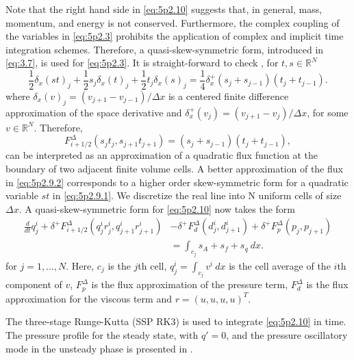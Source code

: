 Note that the right hand side in \eqref{eq:5p2.10} suggests that, in general, mass, momentum, and energy is not conserved. Furthermore, the complex coupling of the variables in \eqref{eq:5p2.3} prohibits the application of complex and implicit time integration schemes. Therefore, a quasi-skew-symmetric form, introduced in \eqref{eq:3.7}, is used for \eqref{eq:5p2.3}. It is straight-forward to check \cite{sjogreen2010skew}, for $t,s\in \mathbb R^{N}$
\begin{equation} \label{eq:5p2.9.1}
	\frac 1 2 \delta_x (st)_j + \frac 1 2 s_j \delta_x (t)_j + \frac 1 2 t_j \delta_x (s)_j = \frac 1 4 \delta_x^+( s_j + s_{j-1} )(t_j + t_{j-1}).
\end{equation}
where $\delta_x (v)_j = \left( v_{j+1} - v_{j-1} \right)/\Delta x$ is a centered finite difference approximation of the space derivative and $\delta_x^+ (v_j) = \left( v_{j+1} - v_j \right) /\Delta x$, for some $v\in \mathbb R^{N}$. Therefore,
\begin{equation} \label{eq:5p2.9.2}
	F_{i+1/2}^{\Delta}(s_jt_j,s_{j+1}t_{j+1}) = ( s_j + s_{j-1} )(t_j + t_{j-1}),
\end{equation}
can be interpreted as an approximation of a quadratic flux function at the boundary of two adjacent finite volume cells. A better approximation of the flux in \eqref{eq:5p2.9.2} corresponds to a higher order skew-symmetric form for a quadratic variable $st$ in \eqref{eq:5p2.9.1}. We discretize the real line into N uniform cells of size $\Delta x$. A quasi-skew-symmetric form for \eqref{eq:5p2.10} now takes the form
\begin{equation}
\begin{aligned}
	\frac{d}{dt} q^i_j + \delta^+ F^{\Delta}_{i+1/2}(q^i_jr^i_j,q^i_{j+1}r^i_{j+1}) &- \delta^+ F_d^{\Delta}(d^i_j,d^i_{j+1}) + \delta^+ F_p^{\Delta}(p_j,p_{j+1}) \\
	&= \int_{c_j} s_A + s_f + s_q \ dx.
\end{aligned}
\end{equation}
for $j=1,\dots,N$. Here, $c_j$ is the $j$th cell, $q^i_j = \int_{c_j} v^i \ dx$ is the cell average of the $i$th component of $v$, $F^{\Delta}_p$ is the flux approximation of the pressure term, $F^{\Delta}_d$ is the flux approximation for the viscous term and $r = ( u , u , u , u )^T$.




The three-stage Runge-Kutta (SSP RK3) \cite{jiang1996efficient} is used to integrate \eqref{eq:5p2.10} in time.
The pressure profile for the steady state, with $q'=0$, and the pressure oscillatory mode in the unsteady phase is presented in .

